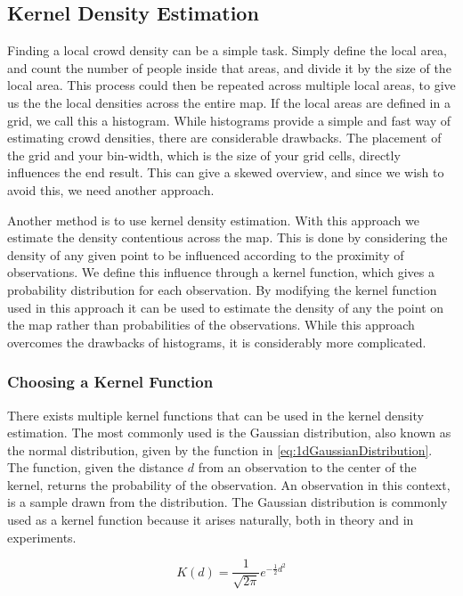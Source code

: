 \subsection{Kernel Density Estimation}
\label{sub:kernelDensityEstimation}

Finding a local crowd density can be a simple task. Simply define the local area, and count the number of people inside that areas, and divide it by the size of the local area. This process could then be repeated across multiple local areas, to give us the the local densities across the entire map. If the local areas are defined in a grid, we call this a histogram. While histograms provide a simple and fast way of estimating crowd densities, there are considerable drawbacks. The placement of the grid and your bin-width, which is the size of your grid cells, directly influences the end result\cite{histogramDrawbacks}. This can give a skewed overview, and since we wish to avoid this, we need another approach.

Another method is to use kernel density estimation. With this approach we estimate the density contentious across the map. This is done by considering the density of any given point to be influenced according to the proximity of observations. We define this influence through a kernel function, which gives a probability distribution for each observation. By modifying the kernel function used in this approach it can be used to estimate the density of any the point on the map rather than probabilities of the observations. While this approach overcomes the drawbacks of histograms, it is considerably more complicated.

\subsubsection{Choosing a Kernel Function}
There exists multiple kernel functions that can be used in the kernel density estimation. The most commonly used is the Gaussian distribution, also known as the normal distribution, given by the function in \cref{eq:1dGaussianDistribution}. The function, given the distance $d$ from an observation to the center of the kernel, returns the probability of the observation. An observation in this context, is a sample drawn from the distribution. The Gaussian distribution is commonly used as a kernel function because it arises naturally, both in theory and in experiments.

\begin{equation}
\label{eq:1dGaussianDistribution}
K(d) = \frac{1}{\sqrt{2\pi}} e^{-\frac{1}{2} d^2}
\end{equation}

